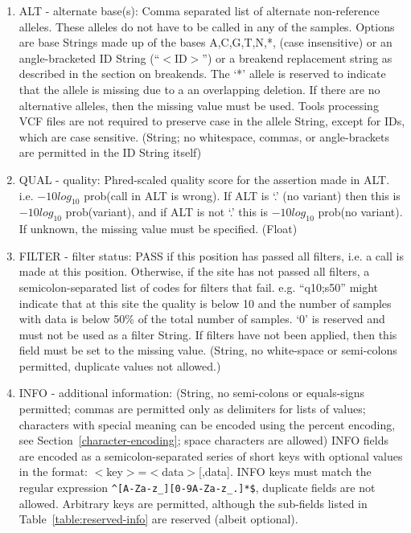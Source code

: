 \documentclass[8pt]{article}
\begin{document}
\begin{enumerate}
  \item ALT - alternate base(s): Comma separated list of alternate non-reference alleles.  These alleles do not have to be called in any of the samples. Options are base Strings made up of the bases A,C,G,T,N,*, (case insensitive) or an angle-bracketed ID String (``$<$ID$>$'') or a breakend replacement string as described in the section on breakends. The `*' allele is reserved to indicate that the allele is missing due to a an overlapping deletion. If there are no alternative alleles, then the missing value must be used.  Tools processing VCF files are not required to preserve case in the allele String, except for IDs, which are case sensitive.  (String; no whitespace, commas, or angle-brackets are permitted in the ID String itself)
  \item QUAL - quality: Phred-scaled quality score for the assertion made in ALT. i.e. $-10log_{10}$ prob(call in ALT is wrong). If ALT is `.' (no variant) then this is $-10log_{10}$ prob(variant), and if ALT is not `.' this is $-10log_{10}$ prob(no variant). If unknown, the missing value must be specified. (Float)
  \item FILTER - filter status: PASS if this position has passed all filters, i.e. a call is made at this position. Otherwise, if the site has not passed all filters, a semicolon-separated list of codes for filters that fail. e.g. ``q10;s50'' might indicate that at this site the quality is below 10 and the number of samples with data is below 50\% of the total number of samples. `0' is reserved and must not be used as a filter String. If filters have not been applied, then this field must be set to the missing value. (String, no white-space or semi-colons permitted, duplicate values not allowed.)
  \item INFO - additional information: (String, no semi-colons or equals-signs permitted; commas are permitted only as delimiters for lists of
  values; characters with special meaning can be encoded using the percent encoding, see Section~\ref{character-encoding}; space characters are allowed)
  INFO fields are encoded as a semicolon-separated series of short keys with optional values in the format: $<$key$>$=$<$data$>$[,data].
  INFO keys must match the regular expression \texttt{\^{}[A-Za-z\_][0-9A-Za-z\_.]*\$}, duplicate fields are not allowed. Arbitrary keys are permitted, although the sub-fields listed in Table~\ref{table:reserved-info} are reserved (albeit optional).


\end{enumerate}
\end{document}
